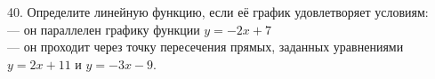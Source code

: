 40. Определите линейную функцию, если её график удовлетворяет условиям:\\
--- он параллелен графику функции $y=-2x+7$\\
--- он проходит через точку пересечения прямых, заданных уравнениями $y=2x+11$ и $y=-3x-9.$\\
